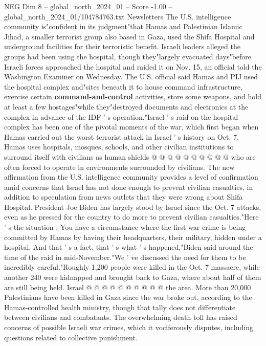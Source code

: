 \begin{textsample}{NEG Dim 8 – global\_north\_2024\_01 – Score -1.00 – global\_north\_2024\_01/104784763.txt}  \label{ex:f8_neg_273}
Newsletters The U.S. intelligence community is"confident in its judgment"that Hamas and Palestinian Islamic Jihad, a smaller terrorist group also based in Gaza, used the Shifa Hospital and underground facilities for their terroristic benefit.
Israeli leaders alleged the groups had been using the hospital, though they"largely evacuated days"before Israeli forces approached the hospital and raided it on Nov. 15, an official told the Washington Examiner on Wednesday.
The U.S. official said Hamas and PIJ used the hospital complex and"sites beneath it to house command infrastructure, exercise certain \textbf{command-and-control} activities, store some weapons, and hold at least a few hostages"while they"destroyed documents and electronics at the complex in advance of the IDF ' s operation."Israel ' s raid on the hospital complex has been one of the pivotal moments of the war, which first began when Hamas carried out the worst terrorist attack in Israel ' s history on Oct. 7.
Hamas uses hospitals, mosques, schools, and other civilian institutions to surround itself with civilians as human shields @ @ @ @ @ @ @ @ @ @ who are often forced to operate in environments surrounded by civilians.
The new affirmation from the U.S. intelligence community provides a level of confirmation amid concerns that Israel has not done enough to prevent civilian casualties, in addition to speculation from news outlets that they were wrong about Shifa Hospital.
President Joe Biden has largely stood by Israel since the Oct. 7 attacks, even as he pressed for the country to do more to prevent civilian casualties."Here ' s the situation : You have a circumstance where the first war crime is being committed by Hamas by having their headquarters, their military, hidden under a hospital.
And that ' s a fact, that ' s what ' s happened,"Biden said around the time of the raid in mid-November."We ' ve discussed the need for them to be incredibly careful."Roughly 1,200 people were killed in the Oct. 7 massacre, while another 240 were kidnapped and brought back to Gaza, where about half of them are still being held.
Israel @ @ @ @ @ @ @ @ @ @ the area.
More than 20,000 Palestinians have been killed in Gaza since the war broke out, according to the Hamas-controlled health ministry, though that tally does not differentiate between civilians and combatants.
The overwhelming death toll has raised concerns of possible Israeli war crimes, which it vociferously disputes, including questions related to collective punishment.

\end{textsample}
